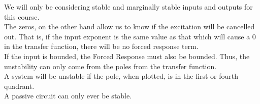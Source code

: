 \documentclass[nobib]{tufte-handout}
\begin{document}
\begin{center}
\end{center}

We will only be considering stable and marginally stable inputs and outputs for
this course.\\ The zeros, on the other hand allow us to know if the excitation
will be cancelled out. That is, if the input exponent is the same value as that
which will cause a 0 in the transfer function, there will be no forced response
term.\\ If the input is bounded, the Forced Response must also be bounded.
Thus, the unstability can only come from the poles from the transfer
function.\\ A system will be unstable if the pole, when plotted, is in the
first or fourth quadrant.\\ A passive circuit can only ever be stable.\\
\end{document}
